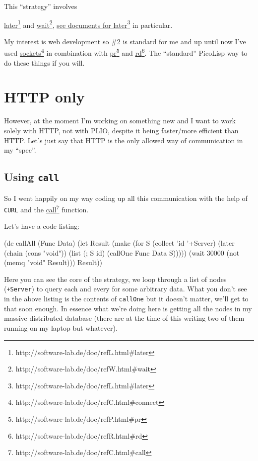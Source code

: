 This ``strategy'' involves

\underline{later}\footnote{http://software-lab.de/doc/refL.html\#later}
and
\underline{wait}\footnote{http://software-lab.de/doc/refW.html\#wait},
\underline{see documents for
  later}\footnote{http://software-lab.de/doc/refL.html\#later} in
particular.

My interest is web development so \#2 is standard for me and up until
now I've used
\underline{sockets}\footnote{http://software-lab.de/doc/refC.html\#connect}
in combination with
\underline{pr}\footnote{http://software-lab.de/doc/refP.html\#pr} and
\underline{rd}\footnote{http://software-lab.de/doc/refR.html\#rd}. The
``standard'' PicoLisp way to do these things if you will.

\section{HTTP only}
\label{sec:bla}

However, at the moment I'm working on something new and I want to work
solely with HTTP, not with PLIO, despite it being faster/more
efficient than HTTP. Let's just say that HTTP is the only allowed way
of communication in my ``spec''.

\subsection{Using \texttt{call}}
\label{sec:bla}

So I went happily on my way coding up all this communication with the
help of \texttt{CURL} and the
\underline{call}\footnote{http://software-lab.de/doc/refC.html\#call}
function.

Let's have a code listing:

\begin{wideverbatim}
(de callAll (Func Data)
   (let Result
      (make
         (for S (collect 'id '+Server)
            (later (chain (cons "void"))
               (list (; S id) (callOne Func Data S)))))
      (wait 30000 (not (memq "void" Result)))
      Result))
\end{wideverbatim}

Here you can see the core of the strategy, we loop through a list of
nodes (\texttt{+Server}) to query each and every for some arbitrary
data. What you don't see in the above listing is the contents of
\texttt{callOne} but it doesn't matter, we'll get to that soon enough.
In essence what we're doing here is getting all the nodes in my
massive distributed database (there are at the time of this writing
two of them running on my laptop but whatever).


